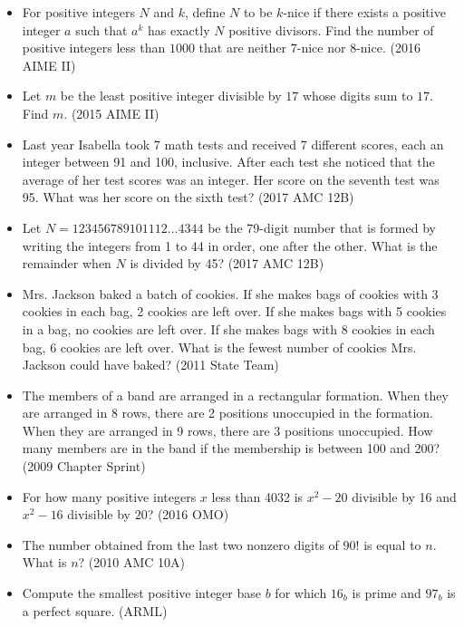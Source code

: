 \documentclass{article}
\begin{document}
\begin{itemize}

\item For positive integers $N$ and $k$, define $N$ to be $k$-nice if there exists a positive integer $a$ such that $a^{k}$ has exactly $N$ positive divisors. Find the number of positive integers less than $1000$ that are neither $7$-nice nor $8$-nice. (2016 AIME II)

\item 
Let $m$ be the least positive integer divisible by $17$ whose digits sum to $17$. Find $m$. (2015 AIME II)

\item Last year Isabella took 7 math tests and received 7 different scores, each an integer between 91 and 100, inclusive. After each test she noticed that the average of her test scores was an integer. Her score on the seventh test was 95. What was her score on the sixth test? (2017 AMC 12B)

\item Let $N=123456789101112\ldots 4344$ be the 79-digit number that is formed by writing the integers from 1 to 44 in order, one after the other. What is the remainder when $N$ is divided by 45? (2017 AMC 12B)

\item Mrs. Jackson baked a batch of cookies. If she makes bags of cookies with 3 cookies in each bag, 2 cookies are left over. If she makes bags with 5 cookies in a bag, no cookies are left over. If she makes bags with 8 cookies in each bag, 6 cookies are left over. What is the fewest number of cookies Mrs. Jackson could have baked? (2011 State Team)

\item The members of a band are arranged in a rectangular formation. When they are arranged in 8 rows, there are 2 positions unoccupied in the formation. When they are arranged in 9 rows, there are 3 positions unoccupied. How many members are in the band if the membership is between 100 and 200? (2009 Chapter Sprint)

\item For how many positive integers $x$ less than 4032 is $x^2-20$ divisible by 16 and $x^2-16$ divisible by $20$? (2016 OMO)

\item The number obtained from the last two nonzero digits of $90!$ is equal to $n$. What is $n$? (2010 AMC 10A)

\item Compute the smallest positive integer base $b$ for which $16_b$ is prime and $97_b$ is a perfect square. (ARML)


\end{itemize}
\end{document}
